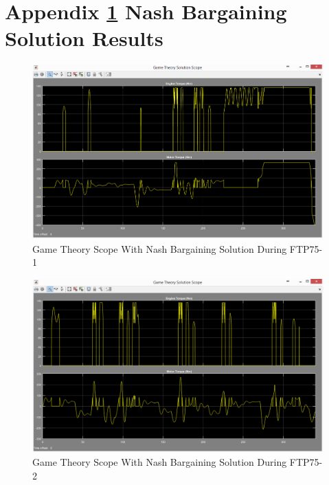 \chapter{Appendix \ref{app:2} Nash Bargaining Solution Results}
\label{app:2}

\begin{figure}[h]
\centering
\includegraphics[scale=0.47]{figures/NashSolution/FTP75-1/gameTheory17Juni}
\caption{Game Theory Scope With Nash Bargaining Solution During FTP75-1}
\label{fig:gtns1}
\end{figure}

\begin{figure}[h]
\centering
\includegraphics[scale=0.47]{figures/NashSolution/FTP75-2/gameTheory19Juni}
\caption{Game Theory Scope With Nash Bargaining Solution During FTP75-2}
\label{fig:gtns2}
\end{figure}

